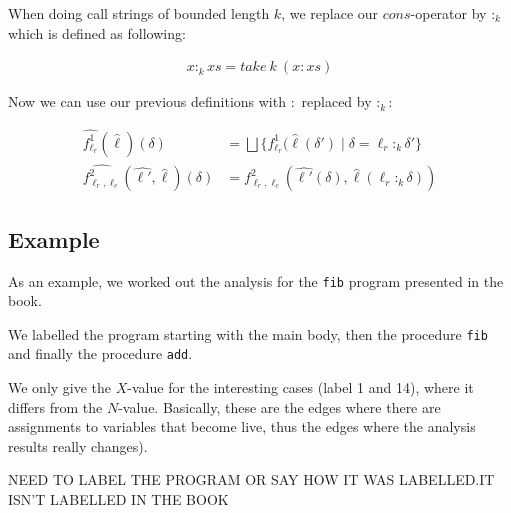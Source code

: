 \documentclass[a4wide,12pt]{article}
\theoremstyle{definition}
\theoremstyle{plain}
\theoremstyle{remark}
\begin{document}
When doing call strings of bounded length $k$, we replace our $cons$-operator by
$:_k$ which is defined as following:

\begin{align}
x :_k xs = take\ k\ (x : xs)
\end{align}

Now we can use our previous definitions with $:$ replaced by $:_k$:

\begin{align}
\widehat{f^1_{\ell_r}} (\widehat{\ell}) (\delta) & = \bigsqcup \{ f^1_{\ell_r} (\widehat{\ell}(\delta') \mid \delta = \ell_r :_k \delta' \} \\
\widehat{f^2_{\ell_r, \ell_c}} (\widehat{\ell'}, \widehat{\ell}) (\delta) & = f^2_{\ell_r, \ell_c} (\widehat{\ell'}(\delta), \widehat{\ell}(\ell_r :_k \delta))
\end{align}

\subsection*{Example}

As an example, we worked out the analysis for the \texttt{fib} program presented in the book.

We labelled the program starting with the main body, then
the procedure \texttt{fib} and finally the procedure \texttt{add}.

We only give the $X$-value for the interesting cases (label 1 and 14), where it differs
from the $N$-value. Basically, these are the edges where there are assignments to variables
that become live, thus the edges where the analysis results really changes).

NEED TO LABEL THE PROGRAM OR SAY HOW IT WAS LABELLED.IT ISN'T LABELLED IN THE BOOK
\end{document}
